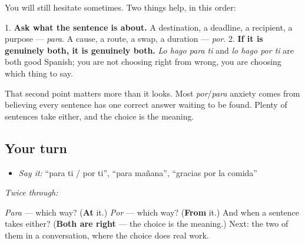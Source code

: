 \begin{grammarlens}[title={Grammar Lens: what to do when you are unsure}]
You will still hesitate sometimes. Two things help, in this order:

1. \textbf{Ask what the sentence is about.} A destination, a deadline, a recipient, a purpose — \emph{para}. A cause, a route, a swap, a duration — \emph{por}. 2. \textbf{If it is genuinely both, it is genuinely both.} \emph{Lo hago para ti} and \emph{lo hago por ti} are both good Spanish; you are not choosing right from wrong, you are choosing which thing to say.

That second point matters more than it looks. Most \emph{por}/\emph{para} anxiety comes from believing every sentence has one correct answer waiting to be found. Plenty of sentences take either, and the choice is the meaning.
\end{grammarlens}

\subsection*{Your turn}
\begin{itemize}
\raggedright
  \item \emph{Say it:} \textquotedblleft{}para ti / por ti\textquotedblright{}, \textquotedblleft{}para mañana\textquotedblright{}, \textquotedblleft{}gracias por la comida\textquotedblright{}
\end{itemize}

\emph{Twice through:}

\begin{tcolorbox}[breakable,colback=teal!4,colframe=teal!35!black,title={Before you move on}]
\emph{Para} — which way? (\textbf{At} it.) \emph{Por} — which way? (\textbf{From} it.) And when a sentence takes either? (\textbf{Both are right} — the choice is the meaning.) Next: the two of them in a conversation, where the choice does real work.
\end{tcolorbox}
